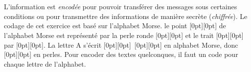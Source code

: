 {{\section*{\BrochureItsInformatics}
L’information est \emph{encodée} pour pouvoir transférer des messages sous certaines conditions ou pour transmettre des informations de manière secrète (\emph{chiffrée}). Le codage de cet exercice est basé sur l’alphabet Morse. le point \raisebox{\dimexpr -0.5ex +0.7ex \relax}[0pt][0pt]{} de l’alphabet Morse est représenté par la perle ronde \raisebox{-0.5ex}[0pt][0pt]{} et le trait \raisebox{\dimexpr -0.5ex +0.7ex \relax}[0pt][0pt]{} par \raisebox{-0.5ex}[0pt][0pt]{}. La lettre A s’écrit \raisebox{\dimexpr -0.5ex +0.7ex \relax}[0pt][0pt]{}~\raisebox{\dimexpr -0.5ex +0.7ex \relax}[0pt][0pt]{} en alphabet Morse, donc \raisebox{-0.5ex}[0pt][0pt]{} en perles. Pour encoder des textes quelconques, il faut un code pour chaque lettre de l’alphabet.

}}
